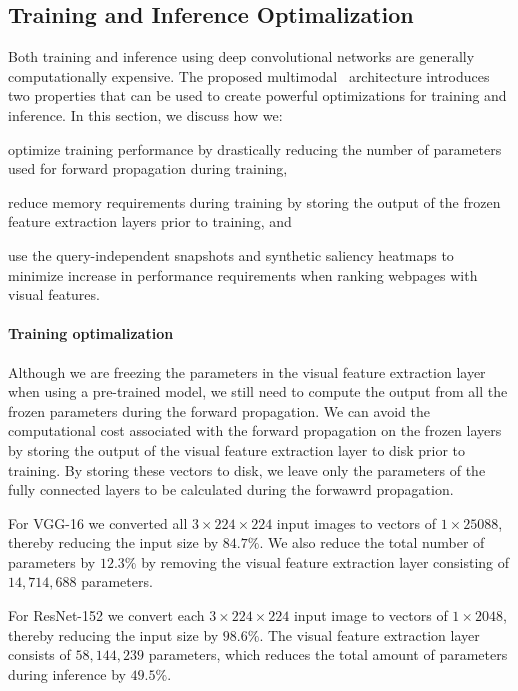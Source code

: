 \subsection{Training and Inference Optimalization}
Both training and inference using deep convolutional networks are generally computationally expensive.
The proposed multimodal \modelname~architecture introduces two properties that can be used to create powerful optimizations for training and inference. In this section, we discuss how we: \begin{inparaenum}[(i)]
\item optimize training performance by drastically reducing the number of parameters used for forward propagation during training, 
\item reduce memory requirements during training by storing the output of the frozen feature extraction layers prior to training, and
\item use the query-independent snapshots and synthetic saliency heatmaps to minimize increase in performance requirements when ranking webpages with visual features.
\end{inparaenum}

\paragraph{Training optimalization}
Although we are freezing the parameters in the visual feature extraction layer when using a pre-trained model, we still need to compute the output from all the frozen parameters during the forward propagation. We can avoid the computational cost associated with the forward propagation on the frozen layers by storing the output of the visual feature extraction layer to disk prior to training. By storing these vectors to disk, we leave only the parameters of the fully connected layers to be calculated during the forwawrd propagation. 

For VGG-16 we converted all $3\times224\times224$ input images to vectors of $1\times25088$, thereby reducing the input size by $84.7\%$. We also reduce the total number of parameters by $12.3\%$ by removing the visual feature extraction layer consisting of $14,714,688$ parameters.

For ResNet-152 we convert each $3\times224\times224$ input image to vectors of $1\times2048$, thereby reducing the input size by $98.6\%$. The visual feature extraction layer consists of $58,144,239$ parameters, which reduces the total amount of parameters during inference by $49.5\%$.

